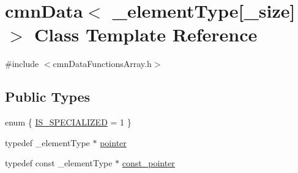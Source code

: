 \hypertarget{classcmn_data_3_01__element_type[__size]_4}{\section{cmn\-Data$<$ \-\_\-element\-Type\mbox{[}\-\_\-size\mbox{]}$>$ Class Template Reference}
\label{classcmn_data_3_01__element_type[__size]_4}
}


{\ttfamily \#include $<$cmn\-Data\-Functions\-Array.\-h$>$}

\subsection*{Public Types}
\begin{DoxyCompactItemize}
\item 
enum \{ \hyperlink{classcmn_data_3_01__element_type[__size]_4_a9d637558f427f9c59075d571e6f9ac5fa11da30d776c8987ce057d7265b627227}{I\-S\-\_\-\-S\-P\-E\-C\-I\-A\-L\-I\-Z\-E\-D} = 1
 \}
\item 
typedef \-\_\-element\-Type $\ast$ \hyperlink{classcmn_data_3_01__element_type[__size]_4_ad12f77b67872d7ed06978b393bc3d29e}{pointer}
\item 
typedef const \-\_\-element\-Type $\ast$ \hyperlink{classcmn_data_3_01__element_type[__size]_4_aaf9e2a181a2500f07b6c99b2bf42477f}{const\-\_\-pointer}
\end{DoxyCompactItemize}
